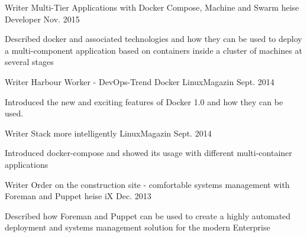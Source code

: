 {}


\begin{cventries}

  \cventry
    {Writer} %
    {Multi-Tier Applications with Docker Compose, Machine and Swarm} %
    {heise Developer} %
    {Nov. 2015} %
    {
      \begin{cvitems} %
        \item {Described docker and associated technologies and how they can be used to deploy a multi-component application based on containers inside a cluster of machines at several stages}
      \end{cvitems}
    }

  \cventry
    {Writer} %
    {Harbour Worker - DevOps-Trend Docker} %
    {LinuxMagazin} %
    {Sept. 2014} %
    {
      \begin{cvitems} %
        \item {Introduced the new and exciting features of Docker 1.0 and how they can be used.}
      \end{cvitems}
    }
  \cventry
    {Writer} %
    {Stack more intelligently} %
    {LinuxMagazin} %
    {Sept. 2014} %
    {
      \begin{cvitems} %
        \item {Introduced docker-compose and showed its usage with different multi-container applications}
      \end{cvitems}
    }
  \cventry
    {Writer} %
    {Order on the construction site - comfortable systems management with Foreman and Puppet} %
    {heise iX} %
    {Dec. 2013} %
    {
      \begin{cvitems} %
        \item {Described how Foreman and Puppet can be used to create a highly automated deployment and systems management solution for the modern Enterprise}
      \end{cvitems}
    }

\end{cventries}
